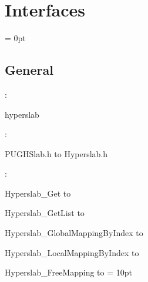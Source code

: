 
\section{Interfaces} 


\parskip = 0pt

\vspace{3mm} \subsection*{General}

: 

hyperslab
\vspace{2mm}

\vspace{5mm}

: 



PUGHSlab.h to Hyperslab.h
\vspace{2mm}

: 



Hyperslab\_Get to 

Hyperslab\_GetList to 

Hyperslab\_GlobalMappingByIndex to 

Hyperslab\_LocalMappingByIndex to 

Hyperslab\_FreeMapping to 
\vspace{2mm}\parskip = 10pt 
